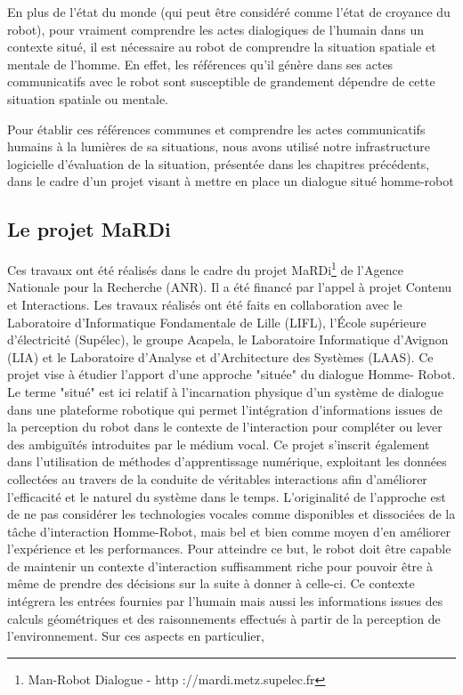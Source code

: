 \documentclass[a4paper,11pt,twoside]{StyleThese}
\begin{document}
En plus de l'état du monde (qui peut être considéré comme l'état de croyance du robot), pour vraiment comprendre les actes dialogiques de l'humain dans un contexte situé, il est nécessaire au robot de comprendre la situation spatiale et mentale de l'homme. En effet, les références qu'il génère dans ses actes communicatifs avec le robot sont susceptible de grandement dépendre de cette situation spatiale ou mentale.

Pour établir ces références communes et comprendre les actes communicatifs humains à la lumières de sa situations, nous avons utilisé notre infrastructure logicielle d'évaluation de la situation, présentée dans les chapitres précédents, dans le cadre d'un projet visant à mettre en place un dialogue situé homme-robot


\subsection{Le projet MaRDi}
Ces travaux ont été réalisés dans le cadre du projet MaRDi\footnote{Man-Robot Dialogue - http ://mardi.metz.supelec.fr
} de l’Agence Nationale pour la Recherche (ANR). Il a été financé par l’appel à projet Contenu et Interactions. Les
travaux réalisés ont été faits en collaboration avec le Laboratoire d’Informatique Fondamentale de Lille (LIFL), l’École supérieure d’électricité (Supélec), le groupe Acapela, le Laboratoire Informatique d’Avignon (LIA) et le Laboratoire d’Analyse et d’Architecture des Systèmes (LAAS).
Ce projet vise à étudier l’apport d’une approche "située" du dialogue Homme-
Robot. Le terme "situé" est ici relatif à l’incarnation physique d’un système de dialogue dans une plateforme robotique qui permet l’intégration d’informations issues de la perception du robot dans le contexte de l’interaction pour compléter ou lever des ambiguïtés introduites par le médium vocal. Ce projet s’inscrit également dans l’utilisation de méthodes d’apprentissage numérique, exploitant les données collectées au travers de la conduite de véritables interactions afin d’améliorer l’efficacité et le naturel du système dans le temps. L’originalité de l’approche est de ne pas considérer les technologies vocales comme disponibles et dissociées de la tâche d’interaction Homme-Robot, mais bel et bien comme moyen d’en améliorer l’expérience et les performances.
Pour atteindre ce but, le robot doit être capable de maintenir un contexte d’interaction suffisamment riche pour pouvoir être à même de prendre des décisions sur la suite à donner à celle-ci. Ce contexte intégrera les entrées fournies par l’humain mais aussi les informations issues des calculs géométriques et des raisonnements effectués à partir de la perception de l’environnement. Sur ces aspects en particulier,
\end{document}
